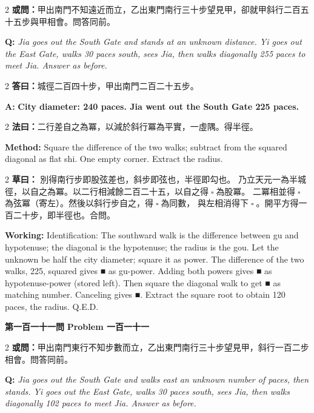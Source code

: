 \documentclass[11pt,a4paper]{article}
\let\origsquare\square
\renewcommand{\square}{\ensuremath{\origsquare}}%
\newcommand{\wen}[1]{%
  \par\vspace{0.5em}%
  \noindent\textcolor{problemcolor}{\textbf{第#1問}}%
  \hfill\textcolor{problemcolor}{\textbf{Problem #1}}\par\nopagebreak%
  \vspace{0.3em}%
}
\newcommand{\owen}[1]{%
  \noindent\textcolor{problemcolor}{\textbf{或問：}}{\tradfont #1}\par\nopagebreak%
}
\newcommand{\oweneng}[1]{%
  \noindent\textcolor{engcolor}{\textbf{Q: }}{\itshape #1}\par\nopagebreak%
}
\newcommand{\fayue}[1]{%
  \noindent\textcolor{methodcolor}{\textbf{法曰：}}{\tradfont #1}\par\nopagebreak%
}
\newcommand{\fayueeng}[1]{%
  \noindent\textcolor{engcolor}{\textbf{Method: }}{#1}\par\nopagebreak%
}
\newcommand{\tsaoyue}[1]{%
  \noindent\textcolor{workcolor}{\textbf{草曰：}}{\tradfont #1}\par%
}
\newcommand{\tsaoyueeng}[1]{%
  \noindent\textcolor{engcolor}{\textbf{Working: }}{\small #1}\par%
}
\newcommand{\dayue}[1]{%
  \noindent\textcolor{anscolor}{\textbf{答曰：}}{\tradfont #1}\par\nopagebreak%
}
\newcommand{\dayueeng}[1]{%
  \noindent\textcolor{engcolor}{\textbf{A: }}{\bfseries #1}\par\nopagebreak%
}
\begin{document}
\begin{paracol}{2}
\owen{甲出南門不知遠近而立，乙出東門南行三十步望見甲，卻就甲斜行二百五十五步與甲相會。問答同前。}
\switchcolumn
\oweneng{Jia goes out the South Gate and stands at an unknown distance. Yi goes out the East Gate, walks 30 paces south, sees Jia, then walks diagonally 255 paces to meet Jia. Answer as before.}
\end{paracol}

\begin{paracol}{2}
\dayue{城徑二百四十步，甲出南門二百二十五步。}
\switchcolumn
\dayueeng{City diameter: 240 paces. Jia went out the South Gate 225 paces.}
\end{paracol}

\begin{paracol}{2}
\fayue{二行差自之為冪，以減於斜行冪為平實，一虛隅。得半徑。}
\switchcolumn
\fayueeng{Square the difference of the two walks; subtract from the squared diagonal as flat shi. One empty corner. Extract the radius.}
\end{paracol}

\begin{paracol}{2}
\tsaoyue{%
別得南行步即股弦差也，斜步即弦也，半徑即勾也。
乃立天元一為半城徑，以自之為冪。以二行相減餘二百二十五，以自之得$ \; \square \; $為股冪。
二冪相並得$ \; \square \; $為弦冪（寄左）。然後以斜行步自之，得$ \; \square \; $為同數，
與左相消得下$ \; \square \; $。開平方得一百二十步，即半徑也。合問。}
\switchcolumn
\tsaoyueeng{%
Identification: The southward walk is the difference between gu and hypotenuse; the diagonal is the hypotenuse; the radius is the gou. Let the unknown be half the city diameter; square it as power. The difference of the two walks, 225, squared gives ■ as gu-power. Adding both powers gives ■ as hypotenuse-power (stored left). Then square the diagonal walk to get ■ as matching number. Canceling gives ■. Extract the square root to obtain 120 paces, the radius. Q.E.D.}
\end{paracol}

\vspace{0.5cm}

\wen{一百一十一}

\begin{paracol}{2}
\owen{甲出南門東行不知步數而立，乙出東門南行三十步望見甲，斜行一百二步相會。問答同前。}
\switchcolumn
\oweneng{Jia goes out the South Gate and walks east an unknown number of paces, then stands. Yi goes out the East Gate, walks 30 paces south, sees Jia, then walks diagonally 102 paces to meet Jia. Answer as before.}
\end{paracol}
\end{document}
